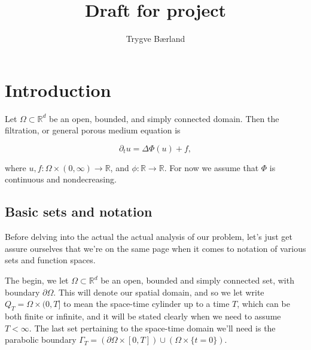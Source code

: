 \documentclass[11pt, a4paper]{article}
\begin{document}
\title{Draft for project}
\author{Trygve Bærland}
\maketitle
{}

\theoremstyle{plain}
\newtheorem{theorem}{Theorem}[section]
\newtheorem{proposition}{Proposition}[section]
\newtheorem{cor}{Corollary}[section]
\newtheorem{lemma}{Lemma}[section]

\theoremstyle{definition}
\newtheorem{mydef}{Definition}[section]
\newtheorem{example}{Example}[section]

\newtheorem{obs}{Observation}
\newtheorem{rem}{Remark}


\section{Introduction}

Let $\Omega \subset \mathbb{R}^d$ be an open, bounded, and simply connected domain. Then the filtration, or general porous medium equation is

\begin{equation}
\label{GPME}
	\partial_t u = \Delta \Phi(u) + f,
\end{equation}

 where $u, f: \Omega \times (0,\infty) \to \mathbb{R}$, and $\phi: \mathbb{R} \to \mathbb{R}$. For now we assume that $\Phi$ is continuous and nondecreasing.

\subsection{Basic sets and notation}
Before delving into the actual the actual analysis of our problem, let's just get assure ourselves that we're on the same page when it comes to notation of various sets and function spaces.

The begin, we let $\Omega \subset \mathbb{R}^d$ be an open, bounded and simply connected set, with boundary $\partial \Omega$. This will denote our spatial domain, and so we let write $Q_T = \Omega \times (0,T]$ to mean the space-time cylinder up to a time $T$, which can be both finite or infinite, and it will be stated clearly when we need to assume $T < \infty$.  The last set pertaining to the space-time domain we'll need is the parabolic boundary $\Gamma_T = (\partial \Omega \times [0,T]) \cup (\Omega\times \{t=0\})$.
\end{document}
